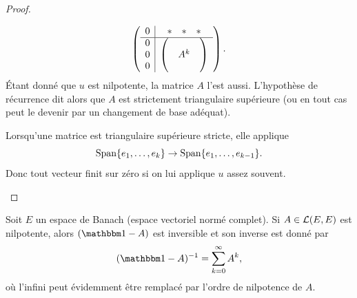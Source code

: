 \begin{proof}
\begin{subproof}
\begin{equation}
               \begin{pmatrix}
                       \begin{array}[]{c|c}
                           0&\begin{matrix}
                               * &   *    &   *
                           \end{matrix}\\
                           \hline
                           \begin{matrix}
                               0 \\
                               0 \\
                               0
                           \end{matrix}&
                           \begin{pmatrix}
                                &       &       \\
                                &   A^k    &       \\
                                &       &
                           \end{pmatrix}
                       \end{array}
               \end{pmatrix}.
           \end{equation}
           Étant donné que \( u\) est nilpotente, la matrice \( A\) l'est aussi. L'hypothèse de récurrence dit alors que \( A\) est strictement triangulaire supérieure (ou en tout cas peut le devenir par un changement de base adéquat).

       \item[\( \Leftarrow\)]

            Lorsqu'une matrice est triangulaire supérieure stricte, elle applique
            \begin{equation}
                \operatorname{Span}\{ e_1,\ldots, e_k \}\to\operatorname{Span}\{ e_1,\ldots, e_{k-1} \}.
            \end{equation}
            Donc tout vecteur finit sur zéro si on lui applique \( u\) assez souvent.
    \end{subproof}
\end{proof}

\begin{proposition}     \label{PROPooWTFWooXHlmhp}
    Soit \( E\) un espace de Banach (espace vectoriel normé complet). Si \( A\in\mathcal{L}(E,E)\) est nilpotente, alors \( (\mtu-A)\) est inversible et son inverse est donné par
    \begin{equation}
        (\mtu-A)^{-1}=\sum_{k=0}^{\infty}A^k,
    \end{equation}
    où l'infini peut évidemment être remplacé par l'ordre de nilpotence de \( A\).
\end{proposition}

